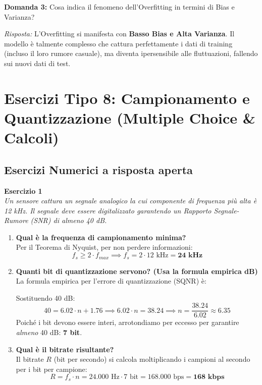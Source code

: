 \vspace{0.5cm}
\textbf{Domanda 3:} Cosa indica il fenomeno dell'Overfitting in termini di Bias e Varianza?

\vspace{0.25cm}
\textit{Risposta:} L'Overfitting si manifesta con \textbf{Basso Bias e Alta Varianza}.
Il modello è talmente complesso che cattura perfettamente i dati di training (incluso il loro rumore casuale), ma diventa ipersensibile alle fluttuazioni, fallendo sui nuovi dati di test.

\section{Esercizi Tipo 8: Campionamento e Quantizzazione (Multiple Choice \& Calcoli)}

\subsection{Esercizi Numerici a risposta aperta}

\textbf{Esercizio 1} \\
\textit{Un sensore cattura un segnale analogico la cui componente di frequenza più alta è 12 kHz. Il segnale deve essere digitalizzato garantendo un Rapporto Segnale-Rumore (SNR) di almeno 40 dB.}

\begin{enumerate}
    \item[\textbf{a.}] \textbf{Qual è la frequenza di campionamento minima?} \\
    Per il Teorema di Nyquist, per non perdere informazioni:
    $$f_s \ge 2 \cdot f_{max} \implies f_s = 2 \cdot 12 \text{ kHz} = \mathbf{24 \text{ kHz}}$$

    \item[\textbf{b.}] \textbf{Quanti bit di quantizzazione servono? (Usa la formula empirica dB)} \\
    La formula empirica per l'errore di quantizzazione (SQNR) è:
    \begin{center}
    \end{center}
    Sostituendo 40 dB:
    $$40 = 6.02 \cdot n + 1.76 \implies 6.02 \cdot n = 38.24 \implies n = \frac{38.24}{6.02} \approx 6.35$$
    Poiché i bit devono essere interi, arrotondiamo per eccesso per garantire \textit{almeno} 40 dB: \textbf{7 bit}.

    \item[\textbf{c.}] \textbf{Qual è il bitrate risultante?} \\
    Il bitrate $R$ (bit per secondo) si calcola moltiplicando i campioni al secondo per i bit per campione:
    $$R = f_s \cdot n = 24.000 \text{ Hz} \cdot 7 \text{ bit} = 168.000 \text{ bps} = \mathbf{168 \text{ kbps}}$$
\end{enumerate}

